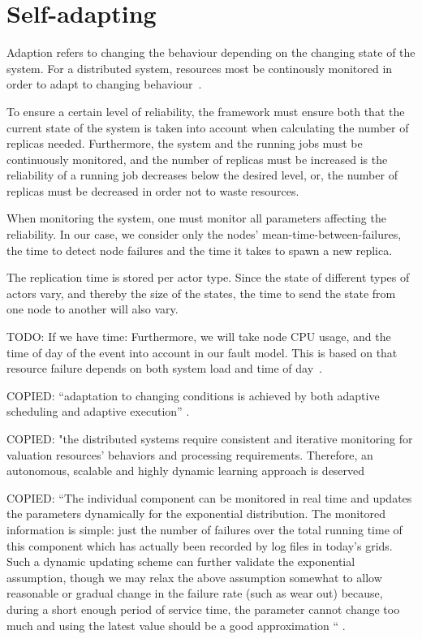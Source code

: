 \documentclass{cslthse-msc}
\begin{document}
\section{Self-adapting} \label{sec:design_self_adapting}
Adaption refers to changing the behaviour depending on the changing state of the system. For a distributed system, resources most be continously monitored in order to adapt to changing behaviour~\cite{imprRelAdaptRL}.

To ensure a certain level of reliability, the framework must ensure both that the current state of the system is taken into account when calculating the number of replicas needed. Furthermore, the system and the running jobs must be continuously monitored, and the number of replicas must be increased is the reliability of a running job decreases below the desired level, or, the number of replicas must be decreased in order not to waste resources.

When monitoring the system, one must monitor all parameters affecting the reliability. In our case, we consider only the nodes' mean-time-between-failures, the time to detect node failures and the time it takes to spawn a new replica.

The replication time is stored per actor type. Since the state of different types of actors vary, and thereby the size of the states, the time to send the state from one node to another will also vary. 

TODO: If we have time:
Furthermore, we will take node CPU usage, and the time of day of the event into account in our fault model. This is based on that resource failure depends on both system load and time of day~\cite{implicationsOfFailures, studyOfFailures}.

\iffalse
COPIED: “adaptation to changing conditions is achieved by both adaptive scheduling and adaptive execution” \cite{evalOfGridRel}.

COPIED:
"the distributed systems require consistent and iterative monitoring for valuation resources’ behaviors and processing requirements. Therefore, an autonomous, scalable and highly dynamic learning approach is deserved \cite{imprRelAdaptRL}


COPIED:
“The individual component can be monitored in real time and updates the parameters dynamically for the exponential distribution. The monitored information is simple: just the number of failures over the total running time of this component which has actually been recorded by log files in today’s grids. Such a dynamic updating scheme can further validate the exponential assumption, though we may relax the above assumption somewhat to allow reasonable or gradual change in the failure rate (such as wear out) because, during a short enough period of service time, the parameter cannot change too much and using the latest value should be a good approximation “ \cite{hierarchicalRelModeling}.
\end{document}
